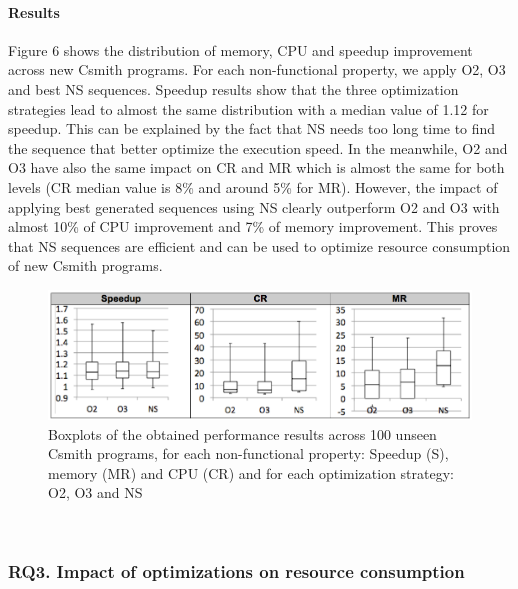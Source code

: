 \paragraph{Results}
Figure 6 shows the distribution of memory, CPU and speedup improvement across new Csmith programs. For each non-functional property, we apply O2, O3 and best NS sequences. Speedup results show that the three optimization strategies lead to almost the same distribution with a median value of 1.12 for speedup. This can be explained by the fact that NS needs too long time to find the sequence that better optimize the execution speed. In the meanwhile, O2 and O3 have also the same impact on CR and MR which is almost the same for both levels (CR median value is 8\% and around 5\% for MR).
However, the impact of applying best generated sequences using NS clearly outperform O2 and O3 with almost 10\% of CPU improvement and 7\% of memory improvement. This proves that NS sequences are efficient and can be used to optimize resource consumption of new Csmith programs.

\begin{figure}[h]
	\centering
	\includegraphics[width=1.\linewidth]{Ressources/box.png}
	\caption{Boxplots of the obtained performance results across 100 unseen Csmith programs, for each non-functional property: Speedup (S), memory (MR) and CPU (CR) and for each optimization strategy: O2, O3 and NS}
\end{figure}

\noindent{}\\
\subsubsection{RQ3. Impact of optimizations on resource consumption}
